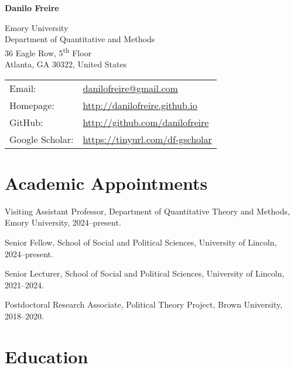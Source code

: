 \documentclass[a4paper]{article}
\def\name{Danilo Freire}
\renewenvironment{itemize}{
	\begin{list}{}{
			\setlength{\leftmargin}{1.5em}
		}
		}{
	\end{list}
}
\begin{document}
{\huge \bf \name}


\vspace{0.25in}

\begin{minipage}{0.45\linewidth}
	Emory University\\
    Department of Quantitative and Methods\\
	36 Eagle Row, 5\textsuperscript{th} Floor\\
	Atlanta, GA 30322, United States
\end{minipage}
\begin{minipage}{0.45\linewidth}
	\begin{tabular}{ll}
		Email:          & \href{mailto:danilofreire@gmail.com}{danilofreire@gmail.com}          \\
		Homepage:       & \href{http://danilofreire.github.io/}{http://danilofreire.github.io} \\
		GitHub:         & \href{http://github.com/danilofreire}{http://github.com/danilofreire} \\
		Google Scholar: & \href{https://tinyurl.com/df-gscholar}{https://tinyurl.com/df-gscholar}
	\end{tabular}
	\end{minipage}

\section*{Academic Appointments}

\begin{itemize}
\item Visiting Assistant Professor, Department of Quantitative Theory and Methods, Emory University, 2024--present.
\item Senior Fellow, School of Social and Political Sciences, University of Lincoln, 2024--present.
\item Senior Lecturer, School of Social and Political Sciences, University of Lincoln, 2021--2024.
\item Postdoctoral Research Associate, Political Theory Project, Brown University, 2018--2020.
\end{itemize}

\section*{Education}
\end{document}
